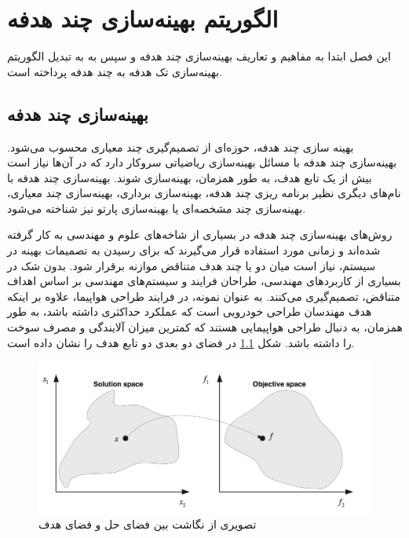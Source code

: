 \chapter{الگوریتم بهینه‌سازی چند هدفه }
این فصل ابتدا به مفاهیم و تعاریف بهینه‌سازی چند هدفه و سپس به
 به تبدیل الگوریتم بهینه‌سازی تک هدفه 
به چند هدفه پرداخته است.


\section{بهینه‌سازی چند هدفه}

بهینه سازی چند هدفه، حوزه‌ای از تصمیم‌گیری چند معیاری محسوب می‌شود. بهینه‌سازی چند هدفه با مسائل بهینه‌سازی ریاضیاتی سروکار دارد که در آن‌ها نیاز است بیش از یک تابع هدف، به طور همزمان، بهینه‌سازی شوند. بهینه‌سازی چند هدفه با نام‌های دیگری نظیر برنامه ریزی چند هدفه، بهینه‌سازی برداری، بهینه‌سازی چند معیاری، بهینه‌سازی چند مشخصه‌ای یا بهینه‌سازی پارتو نیز شناخته می‌شود.


روش‌های بهینه‌سازی چند هدفه در بسیاری از شاخه‌های علوم و مهندسی به کار گرفته شده‌اند و زمانی مورد استفاده قرار می‌گیرند که برای رسیدن به تصمیمات بهینه در سیستم، نیاز است میان دو یا چند هدف متناقض موازنه برقرار شود. بدون شک در بسیاری از کاربردهای مهندسی، طراحان فرایند و سیستم‌های مهندسی بر اساس اهداف متناقض، تصمیم‌گیری می‌کنند. به عنوان نمونه، در فرایند طراحی هواپیما، علاوه بر اینکه هدف مهندسان طراحی خودرویی است که عملکرد حداکثری داشته باشد، به طور همزمان، به دنبال طراحی هواپیمایی هستند که کمترین میزان آلایندگی و مصرف سوخت را داشته باشد. شکل
\ref{fig:multi_space}
در فضای دو بعدی دو تابع هدف را نشان داده است.
\begin{figure}[H]
	\includegraphics[width=16cm]{../Figure/multi-objective/multi_space.png}
	\centering
	\caption{تصویری از نگاشت بین فضای حل و فضای هدف
	\cite{10635_16724}}
\label{fig:multi_space}
\end{figure}


